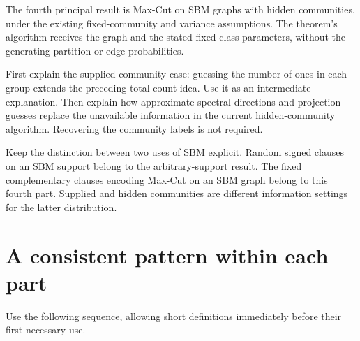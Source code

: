 \documentclass[11pt,a4paper]{article}
\begin{document}
The fourth principal result is Max-Cut on SBM graphs with hidden
communities, under the existing fixed-community and variance assumptions.
The theorem's algorithm receives the graph and the stated fixed class
parameters, without the generating partition or edge probabilities.

First explain the supplied-community case: guessing the number of ones
in each group extends the preceding total-count idea. Use it as an
intermediate explanation. Then explain how approximate spectral
directions and projection guesses replace the unavailable information
in the current hidden-community algorithm. Recovering the community
labels is not required.

Keep the distinction between two uses of SBM explicit. Random signed
clauses on an SBM support belong to the arbitrary-support result.
The fixed complementary clauses encoding Max-Cut on an SBM graph belong
to this fourth part. Supplied and hidden communities are different
information settings for the latter distribution.

\section{A consistent pattern within each part}

Use the following sequence, allowing short definitions immediately before
their first necessary use.
\end{document}
